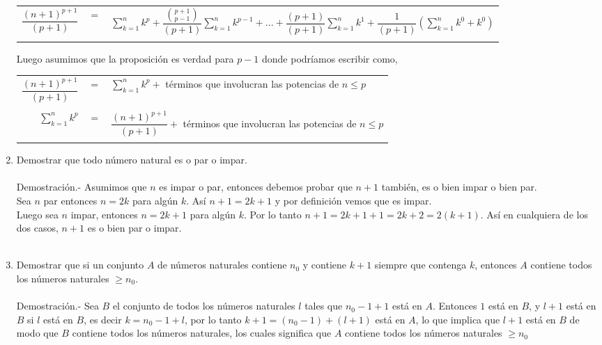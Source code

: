 \begin{enumerate}[\bfseries 1.]
\begin{center}
\begin{tabular}{rcl}
	    $\dfrac{(n+1)^{p+1}}{(p+1)}$&$=$&$\sum\limits_{k=1}^n k^p + \dfrac{{p+1 \choose p-1}}{(p+1)} \sum\limits_{k=1}^n k^{p-1} + ... + \dfrac{(p+1)}{(p+1)} \sum\limits_{k=1}^n k^1 + \dfrac{1}{(p+1)} \left( \sum\limits_{k=1}^n k^0+ k^0 \right)$\\\\
	 \end{tabular}
      \end{center}
      Luego asumimos que la proposición es verdad para $p-1$ donde podríamos escribir como,
      \begin{center}
	 \begin{tabular}{rcl}
	    $\dfrac{(n+1)^{p+1}}{(p+1)}$&$=$&$\sum\limits_{k=1}^{n} k^p +$ términos que involucran las potencias de $n \leq p$\\\\
	    $\sum\limits_{k=1}^n k^p$&$=$&$\dfrac{(n+1)^{p+1}}{(p+1)} + $ términos que involucran las potencias de $n \leq p$\\\\
	 \end{tabular}
      \end{center}

      \item Demostrar que todo número natural es o par o impar.\\\\
      Demostración.- \; Asumimos que $n$ es impar o par, entonces debemos probar que $n+1$ también, es o bien impar o bien par.\\ 
      Sea $n$ par entonces $n=2k$ para algún $k$. Así $n+1=2k+1$  y por definición vemos que es impar.\\
      Luego sea $n$ impar, entonces $n=2k+1$ para algún $k$.  Por lo tanto $n+1=2k+1+1 = 2k +2 = 2(k+1)$. Así en cualquiera de los dos casos, $n+1$ es o bien par o impar. \\\\   

      \item Demostrar que si un conjunto $A$ de números naturales contiene $n_0$ y contiene $k+1$ siempre que contenga $k$, entonces $A$ contiene todos los números naturales $\geq n_0$.\\\\
	 Demostración.- \; Sea $B$ el conjunto de todos los números naturales $l$ tales que $n_0 -1 +1$ está en $A$. Entonces $1$ está en $B$, y $l+1$ está en  $B$ si $l$ está en $B$, es decir $k=n_0 -1 + l $, por lo tanto $k+1=(n_0 -1 )+(l+1)$ está en $A$, lo que implica que $l+1$ está en $B$ de modo que $B$ contiene todos los números naturales, los cuales significa que $A$  contiene todos los números naturales $\geq n_0$\\\\


\end{enumerate}
